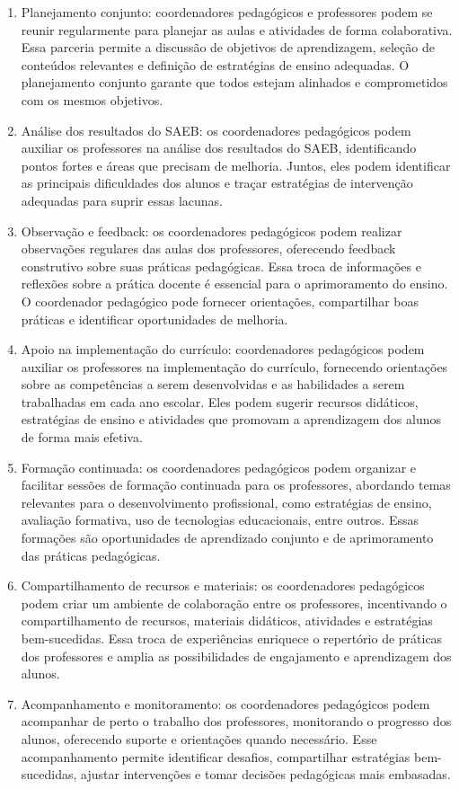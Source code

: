 \begin{enumerate}
\def\labelenumi{\arabic{enumi}.}
\item
  Planejamento conjunto: coordenadores pedagógicos e professores podem
  se reunir regularmente para planejar as aulas e atividades de forma
  colaborativa. Essa parceria permite a discussão de objetivos de
  aprendizagem, seleção de conteúdos relevantes e definição de
  estratégias de ensino adequadas. O planejamento conjunto garante que
  todos estejam alinhados e comprometidos com os mesmos objetivos.
\item
  Análise dos resultados do SAEB: os coordenadores pedagógicos podem
  auxiliar os professores na análise dos resultados do SAEB,
  identificando pontos fortes e áreas que precisam de melhoria. Juntos,
  eles podem identificar as principais dificuldades dos alunos e traçar
  estratégias de intervenção adequadas para suprir essas lacunas.
\item
  Observação e feedback: os coordenadores pedagógicos podem realizar
  observações regulares das aulas dos professores, oferecendo feedback
  construtivo sobre suas práticas pedagógicas. Essa troca de informações
  e reflexões sobre a prática docente é essencial para o aprimoramento
  do ensino. O coordenador pedagógico pode fornecer orientações,
  compartilhar boas práticas e identificar oportunidades de melhoria.
\item
  Apoio na implementação do currículo: coordenadores pedagógicos podem
  auxiliar os professores na implementação do currículo, fornecendo
  orientações sobre as competências a serem desenvolvidas e as
  habilidades a serem trabalhadas em cada ano escolar. Eles podem
  sugerir recursos didáticos, estratégias de ensino e atividades que
  promovam a aprendizagem dos alunos de forma mais efetiva.
\item
  Formação continuada: os coordenadores pedagógicos podem organizar e
  facilitar sessões de formação continuada para os professores,
  abordando temas relevantes para o desenvolvimento profissional, como
  estratégias de ensino, avaliação formativa, uso de tecnologias
  educacionais, entre outros. Essas formações são oportunidades de
  aprendizado conjunto e de aprimoramento das práticas pedagógicas.
\item
  Compartilhamento de recursos e materiais: os coordenadores pedagógicos
  podem criar um ambiente de colaboração entre os professores,
  incentivando o compartilhamento de recursos, materiais didáticos,
  atividades e estratégias bem-sucedidas. Essa troca de experiências
  enriquece o repertório de práticas dos professores e amplia as
  possibilidades de engajamento e aprendizagem dos alunos.
\item
  Acompanhamento e monitoramento: os coordenadores pedagógicos podem
  acompanhar de perto o trabalho dos professores, monitorando o
  progresso dos alunos, oferecendo suporte e orientações quando
  necessário. Esse acompanhamento permite identificar desafios,
  compartilhar estratégias bem-sucedidas, ajustar intervenções e tomar
  decisões pedagógicas mais embasadas.
\end{enumerate}

